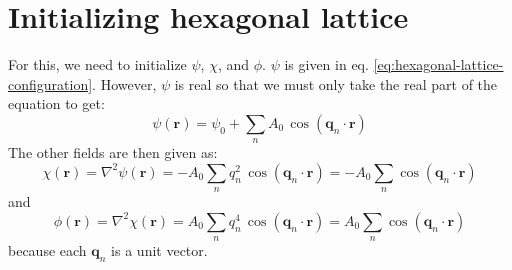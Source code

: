 \documentclass[reqno]{article}
\begin{document}
\section{Initializing hexagonal lattice}

For this, we need to initialize $\psi$, $\chi$, and $\phi$.
$\psi$ is given in eq. \eqref{eq:hexagonal-lattice-configuration}.
However, $\psi$ is real so that we must only take the real part of the equation to get:
\begin{equation}
    \psi\left(\mathbf{r}\right)
    =
    \psi_0
    + \sum_n A_0 \, \cos \left(\mathbf{q}_n \cdot \mathbf{r} \right)
\end{equation}
The other fields are then given as:
\begin{equation}
    \chi(\mathbf{r})
    =
    \nabla^2 \psi(\mathbf{r})
    =
    - A_0 \sum_n q_n^2 \, \cos \left(\mathbf{q}_n \cdot \mathbf{r} \right)
    = 
    - A_0 \sum_n \cos \left(\mathbf{q}_n \cdot \mathbf{r} \right) 
\end{equation}
and
\begin{equation}
    \phi(\mathbf{r})
    =
    \nabla^2 \chi(\mathbf{r})
    =
    A_0 \sum_n q_n^4 \, \cos \left(\mathbf{q}_n \cdot \mathbf{r} \right) 
    =
    A_0 \sum_n \cos \left(\mathbf{q}_n \cdot \mathbf{r} \right) 
\end{equation}
because each $\mathbf{q}_n$ is a unit vector.
\end{document}
